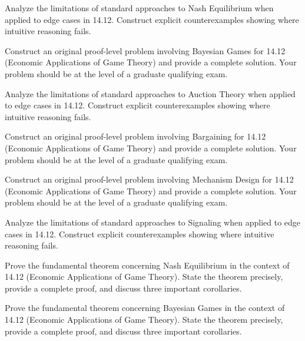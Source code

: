 \documentclass[12pt,a4paper]{exam}
\begin{document}
\begin{questions}

\question[2]
Analyze the limitations of standard approaches to Nash Equilibrium when applied to edge cases in 14.12. Construct explicit counterexamples showing where intuitive reasoning fails.

\vspace{0.3cm}

\question[5]
Construct an original proof-level problem involving Bayesian Games for 14.12 (Economic Applications of Game Theory) and provide a complete solution. Your problem should be at the level of a graduate qualifying exam.

\vspace{0.3cm}

\question[4]
Analyze the limitations of standard approaches to Auction Theory when applied to edge cases in 14.12. Construct explicit counterexamples showing where intuitive reasoning fails.

\vspace{0.3cm}

\question[6]
Construct an original proof-level problem involving Bargaining for 14.12 (Economic Applications of Game Theory) and provide a complete solution. Your problem should be at the level of a graduate qualifying exam.

\vspace{0.3cm}

\question[2]
Construct an original proof-level problem involving Mechanism Design for 14.12 (Economic Applications of Game Theory) and provide a complete solution. Your problem should be at the level of a graduate qualifying exam.

\vspace{0.3cm}

\question[5]
Analyze the limitations of standard approaches to Signaling when applied to edge cases in 14.12. Construct explicit counterexamples showing where intuitive reasoning fails.

\vspace{0.3cm}

\question[7]
Prove the fundamental theorem concerning Nash Equilibrium in the context of 14.12 (Economic Applications of Game Theory). State the theorem precisely, provide a complete proof, and discuss three important corollaries.

\vspace{0.3cm}

\question[3]
Prove the fundamental theorem concerning Bayesian Games in the context of 14.12 (Economic Applications of Game Theory). State the theorem precisely, provide a complete proof, and discuss three important corollaries.


\end{questions}
\end{document}
